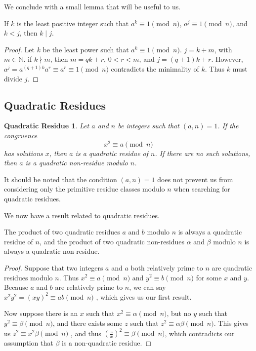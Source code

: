 \documentclass{article}
\theoremstyle{plain}
\begin{document}
We conclude with a small lemma that will be useful to us.
\begin{lemma}
If $k$ is the least positive integer such that $a^k \equiv 1 \pmod n$, $a^j \equiv 1 \pmod n$, and $k < j$, then $k \mid j$.
\end{lemma}
\begin{proof}
Let $k$ be the least power such that $a^k \equiv 1 \pmod n$. $j = k + m$, with $m \in \mathbb N$. if $k \nmid m$, then $m = qk+ r$, $ 0 < r < m$, and $j = (q+1)k + r$. However, $a^j = a^{(q+1)k}a^r \equiv a^r \equiv 1 \pmod n$ contradicts the minimality of $k$. Thus $k$ must divide $j$.
\end{proof}

\subsection*{Quadratic Residues}
\newtheorem*{quadraticresiduedefinition}{Quadratic Residue}
\begin{quadraticresiduedefinition}
Let $a$ and $n$ be integers such that $(a,n) = 1$. If the congruence
	$$x^2 \equiv a \pmod n$$
has solutions $x$, then $a$ is a \textit{quadratic residue} of $n$. If there are no such solutions, then $a$ is a \textit{quadratic non-residue} modulo $n$.
\end{quadraticresiduedefinition}

\par It should be noted that the condition $(a,n) = 1$ does not prevent us from considering only the primitive residue classes modulo $n$ when searching for quadratic residues. 

\par We now have a result related to quadratic residues.
 \begin{theorem}
 The product of two quadratic residues $a$ and $b$ modulo $n$ is always a quadratic residue of $n$, and the product of two quadratic non-residues $\alpha$ and $\beta$ modulo $n$ is always a quadratic non-residue.
 \end{theorem}
 \begin{proof}
 Suppose that two integers $a$ and $a$ both relatively prime to $n$ are quadratic residues modulo $n$. Thus $x^2 \equiv a
  \pmod n$ and $y^2 \equiv b \pmod n$ for some $x$ and $y$. Because $a$ and $b$ are relatively prime to $n$, we can say
   $x^2y^2 = (xy)^2 \equiv ab \pmod n$ , which gives us our first result.
 \par Now suppose there is an $x$ such that  $x^2 \equiv \alpha \pmod n$, but no $y$ such that  $y^2 \equiv \beta \pmod n$,
  and there exists some $z$ such that $z^2 \equiv \alpha\beta \pmod n$. This gives us $z^2 \equiv x^2 \beta \pmod n$ , and thus 
  $\left( \frac{z}{x} \right)^2 \equiv \beta \pmod n$, which contradicts our assumption that $\beta$ is a non-quadratic residue.
 \end{proof}
 
\end{document}
